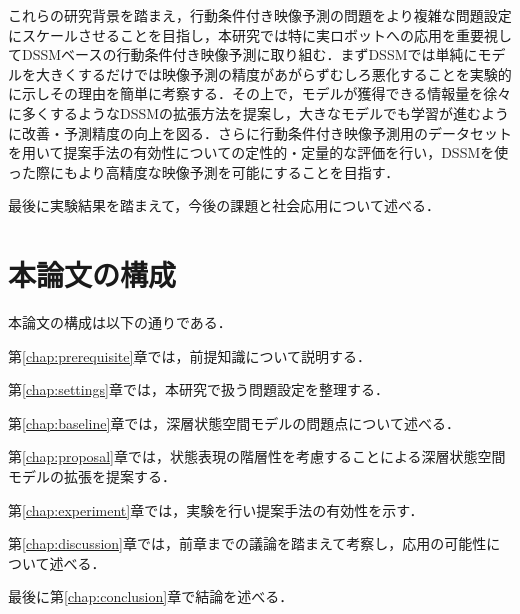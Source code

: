 これらの研究背景を踏まえ，行動条件付き映像予測の問題をより複雑な問題設定にスケールさせることを目指し，本研究では特に実ロボットへの応用を重要視してDSSMベースの行動条件付き映像予測に取り組む．まずDSSMでは単純にモデルを大きくするだけでは映像予測の精度があがらずむしろ悪化することを実験的に示しその理由を簡単に考察する．その上で，モデルが獲得できる情報量を徐々に多くするようなDSSMの拡張方法を提案し，大きなモデルでも学習が進むように改善・予測精度の向上を図る．さらに行動条件付き映像予測用のデータセットを用いて提案手法の有効性についての定性的・定量的な評価を行い，DSSMを使った際にもより高精度な映像予測を可能にすることを目指す．

最後に実験結果を踏まえて，今後の課題と社会応用について述べる．

\section{本論文の構成}

本論文の構成は以下の通りである．

第\ref{chap:prerequisite}章では，前提知識について説明する．

第\ref{chap:settings}章では，本研究で扱う問題設定を整理する．

第\ref{chap:baseline}章では，深層状態空間モデルの問題点について述べる．

第\ref{chap:proposal}章では，状態表現の階層性を考慮することによる深層状態空間モデルの拡張を提案する．

第\ref{chap:experiment}章では，実験を行い提案手法の有効性を示す．

第\ref{chap:discussion}章では，前章までの議論を踏まえて考察し，応用の可能性について述べる．

最後に第\ref{chap:conclusion}章で結論を述べる．